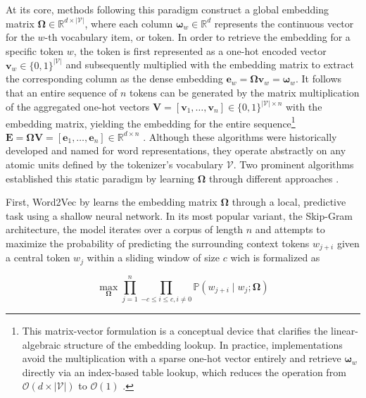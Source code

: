 At its core, methods following this paradigm construct a global embedding matrix $\mathbf{\Omega} \in \mathbb{R}^{d \times |\mathcal{V}|}$, where each column $\boldsymbol{\omega}_w \in \mathbb{R}^d$ represents the continuous vector for the $w$-th vocabulary item, or token. In order to retrieve the embedding for a specific token $w$, the token is first represented as a one-hot encoded vector $\mathbf{v}_w \in \{0,1\}^{|\mathcal{V}|}$ and subsequently multiplied with the embedding matrix to extract the corresponding column as the dense embedding $\mathbf{e}_w = \mathbf{\Omega} \mathbf{v}_w = \boldsymbol{\omega}_w$. It follows that an entire sequence of $n$ tokens can be generated by the matrix multiplication of the aggregated one-hot vectors $\mathbf{V} = [\mathbf{v}_1, \dots, \mathbf{v}_n] \in \{0,1\}^{|\mathcal{V}| \times n}$ with the embedding matrix, yielding the embedding for the entire sequence\footnote{This matrix-vector formulation is a conceptual device that clarifies the linear-algebraic structure of the embedding lookup. In practice, implementations avoid the multiplication with a sparse one-hot vector entirely and retrieve $\boldsymbol{\omega}_w$ directly via an index-based table lookup, which reduces the operation from $\mathcal{O}(d \times |\mathcal{V}|)$ to $\mathcal{O}(1)$ \cite[p. 133 f.]{Jurafsky2024_SLP}.} $\mathbf{E} = \mathbf{\Omega} \mathbf{V} = [\mathbf{e}_1, \dots, \mathbf{e}_n] \in \mathbb{R}^{d \times n}$ \cite[p. 375]{Bishop2024}\cite[p. 133 f.]{Jurafsky2024_SLP}\cite[p. 89 f., p. 124 f.]{Goldberg2017}\citep[p. 218]{prince2023understanding}.
Although these algorithms were historically developed and named for word representations, they operate abstractly on any atomic units defined by the tokenizer's vocabulary $\mathcal{V}$. Two prominent algorithms established this static paradigm by learning $\mathbf{\Omega}$ through different approaches \cite[p. 375]{Bishop2024}.

First, Word2Vec by \citet{Mikolov2013} learns the embedding matrix $\mathbf{\Omega}$ through a local, predictive task using a shallow neural network. In its most popular variant, the Skip-Gram architecture, the model iterates over a corpus of length $n$ and attempts to maximize the probability of predicting the surrounding context tokens $w_{j+i}$ given a central token $w_j$ within a sliding window of size $c$ wich is formalized as 

\vspace{-1.5em}
\begin{equation}
\max_{\mathbf{\Omega}} \prod_{j=1}^{n} \prod_{-c \leq i \leq c, i \neq 0} \mathbb{P}(w_{j+i} \mid w_j; \mathbf{\Omega})
\end{equation}
\vspace{-1em}

